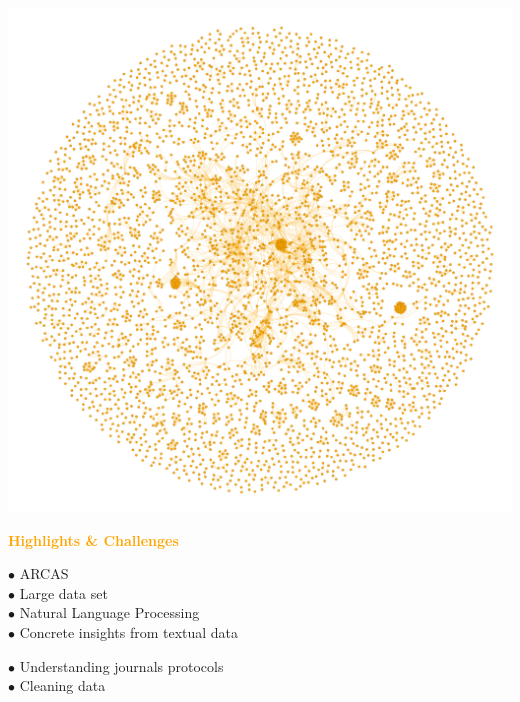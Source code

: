 \documentclass{beamer}
\begin{document}
\begin{frame}
    \begin{center}
    
    \end{center}
\end{frame}

\begin{frame}
    \begin{center}
        \includegraphics[width=.7\textwidth]{static/pd.png}
    \end{center}
\end{frame}

\begin{frame}
    \begin{center}
        \Large{\textbf{\textcolor{orange}{Highlights \& Challenges}}}
    \end{center}
    \vspace{.8cm} \pause

    \begin{minipage}{.5\textwidth}
        \(\bullet\) ARCAS  \vspace{.1cm} \\ \pause
        \(\bullet\) Large data set \vspace{.1cm} \\ \pause
        \(\bullet\) Natural Language Processing  \vspace{.1cm} \\ \pause
        \(\bullet\) Concrete insights from textual data \pause
    \end{minipage} \hfill
    \begin{minipage}{.45\textwidth}
        \(\bullet\) Understanding journals protocols \vspace{.1cm} \\ \pause
        \(\bullet\) Cleaning data \\
    \end{minipage}
\end{frame}
\end{document}
